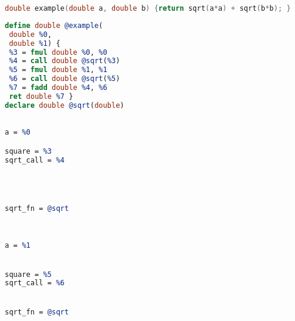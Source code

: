 \centering
\begin{minipage}[t]{\textwidth}
\centering
\begin{minipage}[t]{\textwidth}
\centering
\vspace{-1em}
\begin{lstlisting}[language=C,basicstyle=\small\ttfamily,
                   numbers=none,framexleftmargin=0pt,xleftmargin=0pt,
                   captionpos=t,title={{\bf(a)} {} C program code:}]
 double example(double a, double b) {return sqrt(a*a) + sqrt(b*b); }
\end{lstlisting}
\end{minipage}
\begin{minipage}[t]{7.1cm}
\centering
\vspace{-0.19cm}
\begin{lstlisting}[language={LLVM},
                   captionpos=t,title={{\bf(b)} {} Resulting LLVM IR:}]
define double @example(    
 double %0,                
 double %1) {              
 %3 = fmul double %0, %0   
 %4 = call double @sqrt(%3)
 %5 = fmul double %1, %1   
 %6 = call double @sqrt(%5)
 %7 = fadd double %4, %6   
 ret double %7 }
declare double @sqrt(double)      
\end{lstlisting}
\end{minipage}
\hfill
\begin{minipage}[t]{3.5cm}
\centering
\vspace{-0.19cm}
\begin{lstlisting}[language=LLVM,
                   numbers=none,framexleftmargin=0pt,xleftmargin=0pt,
                   captionpos=t,title={{\bf(c)} {} First solution:}]

a = %0

square = %3
sqrt_call = %4 




sqrt_fn = @sqrt
\end{lstlisting}
\end{minipage}
\hfill
\begin{minipage}[t]{3.5cm}
\centering
\vspace{-0.19cm}
\begin{lstlisting}[language=LLVM,
                   numbers=none,framexleftmargin=0pt,xleftmargin=0pt,
                   captionpos=t,title={{\bf(d)} {} Second solution:}]


a = %1


square = %5
sqrt_call = %6


sqrt_fn = @sqrt
\end{lstlisting}
\end{minipage}
\end{minipage}

